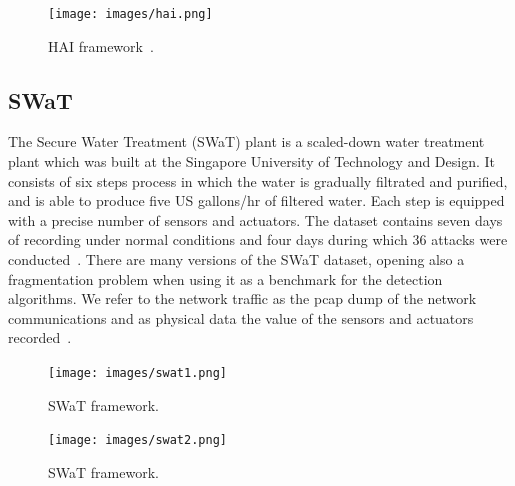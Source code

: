 \documentclass[english,12pt]{article}
\begin{document}
\begin{figure}[htb]
  \begin{centering}
      \texttt{[image: images/hai.png]}
  \par\end{centering}
  \caption{\label{fig:hai}HAI framework~\cite{DBLP:conf/uss/ChoiCYMK20}.}
\end{figure}


\subsection{SWaT} \label{SWAT}

The Secure Water Treatment (SWaT) plant is a scaled-down water treatment plant which was built at the Singapore
University of Technology and Design. It consists of six steps process in which the water is gradually filtrated
and purified, and is able to produce five US gallons/hr of filtered water. Each step is equipped with a precise
number of sensors and actuators. The dataset contains seven days of recording under normal conditions and four
days during which 36 attacks were conducted~\cite{DBLP:journals/corr/abs-1907-01216}. There are many versions
of the SWaT dataset, opening also a fragmentation problem when using it as a benchmark for the detection algorithms.
We refer to the network traffic as the pcap dump of the network communications and as physical data the value of
the sensors and actuators recorded~\cite{DBLP:conf/ccs/TurrinETC20}.

\begin{figure}[htb]
  \begin{centering}
      \texttt{[image: images/swat1.png]}
  \par\end{centering}
  \caption{\label{fig:swat1}SWaT framework.}
\end{figure}

\begin{figure}[!htb]
  \begin{centering}
      \texttt{[image: images/swat2.png]}
  \par\end{centering}
  \caption{\label{fig:swat2}SWaT framework.}
\end{figure}
\end{document}
